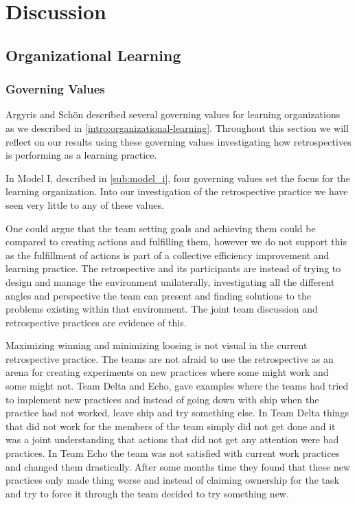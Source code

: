 \chapter{Discussion}
\section{Organizational Learning} %
\label{sec:organizational_learning}
\subsection{Governing Values}
Argyris and Schön\cite{Argyris1996} described several governing values for learning organizations as we described in \autoref{intro:organizational-learning}. Throughout this section we will reflect on our results using these governing values investigating how retrospectives is performing as a learning practice. 

In Model I, described in \autoref{sub:model_i}, four governing values set the focus for the learning organization. Into our investigation of the retrospective practice we have seen very little to any of these values. 

One could argue that the team setting goals and achieving them could be compared to creating actions and fulfilling them, however we do not support this as the fulfillment of actions is part of a collective efficiency improvement and learning practice. The retrospective and its participants are instead of trying to design and manage the environment unilaterally, investigating all the different angles and perspective the team can present and finding solutions to the problems existing within that environment. The joint team discussion and retrospective practices are evidence of this. 

Maximizing winning and minimizing loosing is not visual in the current retrospective practice. The teams are not afraid to use the retrospective as an arena for creating experiments on new practices where some might work and some might not. Team Delta and Echo, gave examples where the teams had tried to implement new practices and instead of going down with ship when the practice had not worked, leave ship and try something else. In Team Delta things that did not work for the members of the team simply did not get done and it was a joint understanding that actions that did not get any attention were bad practices. In Team Echo the team was not satisfied with current work practices and changed them drastically. After some months time they found that these new practices only made thing worse and instead of claiming ownership for the task and try to force it through the team decided to try something new. 

